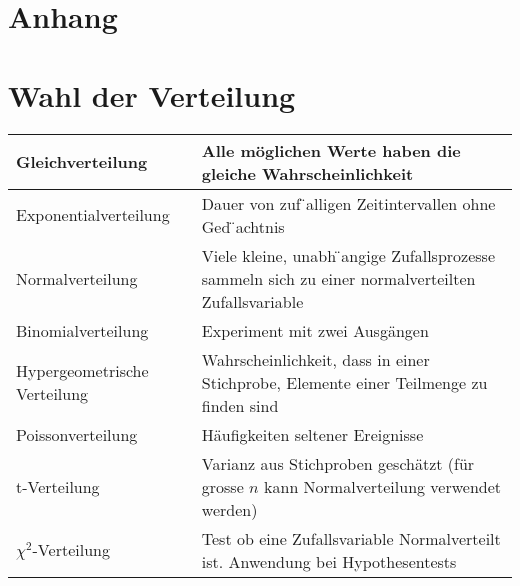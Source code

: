 \documentclass[margin=normal]{tex/hsrzf}
\begin{document}
\newpage
\section{Anhang}
\section{Wahl der Verteilung}
\begin{tabular}{|l|p{10cm}|}
    \hline
    Gleichverteilung             & Alle möglichen Werte haben die gleiche Wahrscheinlichkeit                                         \\
    \hline
    Exponentialverteilung        & Dauer von zuf ̈alligen Zeitintervallen ohne Ged ̈achtnis                                            \\
    \hline
    Normalverteilung             & Viele kleine, unabh ̈angige Zufallsprozesse sammeln sich zu einer normalverteilten Zufallsvariable \\
    \hline
    Binomialverteilung           & Experiment mit zwei Ausgängen                                                                     \\
    \hline
    Hypergeometrische Verteilung & Wahrscheinlichkeit, dass in einer Stichprobe, Elemente einer Teilmenge zu finden sind             \\
    \hline
    Poissonverteilung            & Häufigkeiten seltener Ereignisse                                                                  \\
    \hline
    t-Verteilung                 & Varianz aus Stichproben geschätzt (für grosse $n$ kann Normalverteilung verwendet werden)         \\
    \hline
    $\chi^2$-Verteilung          & Test ob eine Zufallsvariable Normalverteilt ist. Anwendung bei Hypothesentests                    \\
    \hline
\end{tabular}
\end{document}
